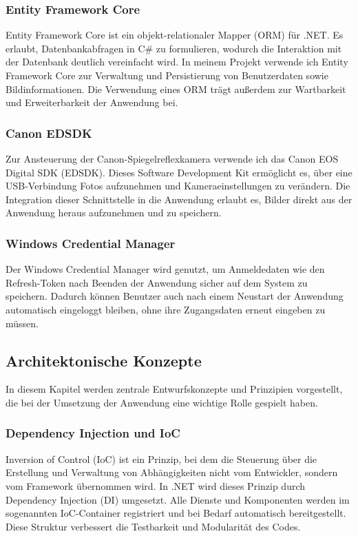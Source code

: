 \subsubsection{Entity Framework Core}
Entity Framework Core ist ein objekt-relationaler Mapper (ORM) für .NET.
Es erlaubt, Datenbankabfragen in C\# zu formulieren, wodurch die Interaktion
mit der Datenbank deutlich vereinfacht wird. In meinem Projekt verwende ich
Entity Framework Core zur Verwaltung und Persistierung von Benutzerdaten sowie
Bildinformationen. Die Verwendung eines ORM trägt außerdem zur Wartbarkeit und
Erweiterbarkeit der Anwendung bei.

\subsubsection{Canon EDSDK}
Zur Ansteuerung der Canon-Spiegelreflexkamera verwende ich das Canon EOS Digital
SDK (EDSDK). Dieses Software Development Kit ermöglicht es, über eine
USB-Verbindung Fotos aufzunehmen und Kameraeinstellungen zu verändern.
Die Integration dieser Schnittstelle in die Anwendung erlaubt es, Bilder direkt
aus der Anwendung heraus aufzunehmen und zu speichern.

\subsubsection{Windows Credential Manager}
Der Windows Credential Manager wird genutzt, um Anmeldedaten wie den Refresh-Token
nach Beenden der Anwendung sicher auf dem System zu speichern.
Dadurch können Benutzer auch nach einem Neustart der Anwendung
automatisch eingeloggt bleiben, ohne ihre Zugangsdaten erneut eingeben zu müssen.

\subsection{Architektonische Konzepte}

In diesem Kapitel werden zentrale Entwurfskonzepte und Prinzipien vorgestellt,
die bei der Umsetzung der Anwendung eine wichtige Rolle gespielt haben.

\subsubsection{Dependency Injection und IoC}
Inversion of Control (IoC) ist ein Prinzip, bei dem die Steuerung über
die Erstellung und Verwaltung von Abhängigkeiten nicht vom Entwickler,
sondern vom Framework übernommen wird. In .NET wird dieses Prinzip durch
Dependency Injection (DI) umgesetzt. Alle Dienste und Komponenten werden im
sogenannten IoC-Container registriert und bei Bedarf automatisch bereitgestellt.
Diese Struktur verbessert die Testbarkeit und Modularität des Codes.

